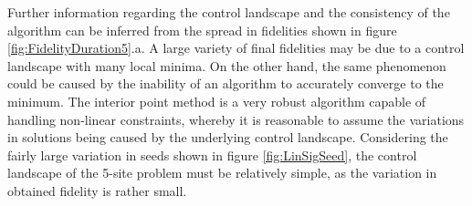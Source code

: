 Further information regarding the control landscape and the consistency of the algorithm can be inferred from the spread in fidelities shown in figure \ref{fig:FidelityDuration5}.a. A large variety of final fidelities may be due to a control landscape with many local minima. On the other hand, the same phenomenon could be caused by the inability of an algorithm to accurately converge to the minimum. The interior point method is a very robust algorithm capable of handling non-linear constraints, whereby it is reasonable to assume the variations in solutions being caused by the underlying control landscape. Considering the fairly large variation in seeds shown in figure \ref{fig:LinSigSeed}, the control landscape of the 5-site problem must be relatively simple, as the variation in obtained fidelity is rather small.


